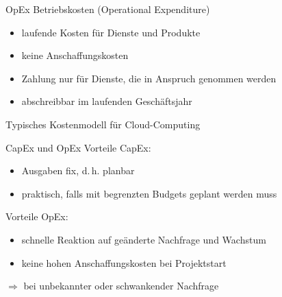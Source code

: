 \begin{flashcard}[Definition]{OpEx}
    Betriebskosten (Operational Expenditure)
    \begin{itemize}
        \item laufende Kosten für Dienste und Produkte
        \item keine Anschaffungskosten
        \item Zahlung nur für Dienste, die in Anspruch genommen werden
        \item abschreibbar im laufenden Geschäftsjahr
    \end{itemize}

    Typisches Kostenmodell für Cloud-Computing
\end{flashcard}

\begin{flashcard}[Vergleiche]{CapEx und OpEx}
    Vorteile CapEx:
    \begin{itemize}
        \item Ausgaben fix, d.\,h. planbar
        \item praktisch, falls mit begrenzten Budgets geplant werden muss
    \end{itemize}

    Vorteile OpEx:
    \begin{itemize}
        \item schnelle Reaktion auf geänderte Nachfrage und Wachstum
        \item keine hohen Anschaffungskosten bei Projektstart
    \end{itemize}
    $\Rightarrow$ bei unbekannter oder schwankender Nachfrage

\end{flashcard}

